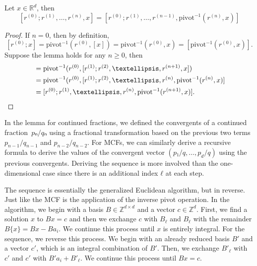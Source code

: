 \begin{lemma}
  \label{lem:mdcf-nesting}
  Let $x ∈ ℝ^d$, then
  \[
    [r^{(0)}; r^{(1)}, …, r^{(n)}, x]
    = [r^{(0)}; r^{(1)}, …, r^{(n-1)}, \mathrm{pivot}^{-1}(r^{(n)}, x)]
  \]
\end{lemma}

\begin{proof}
  If $n = 0$, then by definition,
  \[
    [r^{(0)}; x] = \mathrm{pivot}^{-1}(r^{(0)}, [x]) = \mathrm{pivot}^{-1}(r^{(0)}, x) = [\mathrm{pivot}^{-1}(r^{(0)}, x)].
  \]
  Suppose the lemma holds for any $n ≥ 0$, then
  \begin{align*}
    [r^{(0)}; r^{(1)}, …, r^{(n+1)}, x]
    & = \mathrm{pivot}^{-1}(r^{(0)}, [r^{(1)}; r^{(2)}, …, r^{(n+1)}, x]) \\
    & = \mathrm{pivot}^{-1}(r^{(0)}, [r^{(1)}; r^{(2)}, …, r^{(n)}, \mathrm{pivot}^{-1}(r^{(n)}, x)] \\
    & = [r^{(0)}; r^{(1)}, …, r^{(n)}, \mathrm{pivot}^{-1}(r^{(n+1)}, x)]. \qedhere
  \end{align*}
\end{proof}

In the lemma for continued fractions,
we defined the convergents of a continued fraction~$pₙ/qₙ$
using a fractional transformation based on the previous two
terms~$p_{n-1}/q_{n-1}$ and $p_{n-2}/q_{n-2}$.
For MCFs, we can similarly derive a recursive formula to derive the values of
the convergent vector $(p₁/q, \dots, p_d/q)$ using the previous convergents.
Deriving the sequence is more involved than the one-dimensional case since
there is an additional index $ℓ$ at each step.

The sequence is essentially the generalized Euclidean algorithm, but in reverse.
Just like the MCF is the application of the inverse pivot operation.
In the algorithm, we begin with a basis $B ∈ ℤ^{d×d}$ and a vector $c ∈ ℤ^d$.
First, we find a solution $x$ to $Bx = c$ and then we exchange $c$ with $B_ℓ$
and $B_ℓ$ with the remainder $B\{x\} = Bx - Ba_i$.
We continue this process until $x$ is entirely integral.
For the sequence, we reverse this process.
We begin with an already reduced basis $B'$ and a vector $c'$, which is an
integral combination of $B'$.
Then, we exchange $B'_{ℓ}$ with $c'$ and $c'$ with $B' a_i + B'_{ℓ}$.
We continue this process until $B x = c$.

